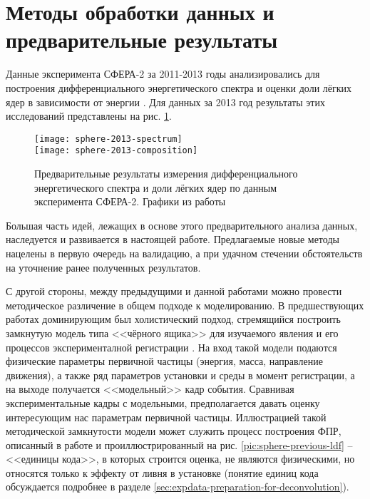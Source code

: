 \section{Методы обработки данных и предварительные результаты}

Данные эксперимента СФЕРА-2 за 2011-2013 годы анализировались для построения дифференциального энергетического спектра и оценки доли лёгких ядер в зависимости от энергии \cite{Antonov2013, Chernov2017-ICRC}. Для данных за 2013 год результаты этих исследований представлены на рис. \ref{pic:sphere-previous-results}.

\begin{figure}
	\centering
	\texttt{[image: sphere-2013-spectrum]}
	\\
	\texttt{[image: sphere-2013-composition]}
	\caption{Предварительные результаты измерения дифференциального энергетического спектра и доли лёгких ядер по данным эксперимента СФЕРА-2. Графики из работы \cite[рис. 8 и рис. 10]{Chernov2017-ICRC}}
	\label{pic:sphere-previous-results}
\end{figure}

Большая часть идей, лежащих в основе этого предварительного анализа данных, наследуется и развивается в настоящей работе. Предлагаемые новые методы нацелены в первую очередь на валидацию, а при удачном стечении обстоятельств на уточнение ранее полученных результатов.

С другой стороны, между предыдущими и данной работами можно провести методическое различение в общем подходе к моделированию. В предшествующих работах доминирующим был холистический подход, стремящийся построить замкнутую модель типа <<чёрного ящика>> для изучаемого явления и его процессов эксперименталной регистрации \cite{Chernov2015}. На вход такой модели подаются физические параметры первичной частицы (энергия, масса, направление движения), а также ряд параметров установки и среды в момент регистрации, а на выходе получается <<модельный>> кадр события. Сравнивая экспериментальные кадры с модельными, предполагается давать оценку интересующим нас параметрам первичной частицы. Иллюстрацией такой методической замкнутости модели может служить процесс построения ФПР, описанный в работе \cite{Sphere2015} и проиллюстрированный на рис. \ref{pic:sphere-previous-ldf} -- <<единицы кода>>, в которых строится оценка, не являются физическими, но относятся только к эффекту от ливня в установке (понятие единиц кода обсуждается подробнее в разделе \ref{sec:expdata-preparation-for-deconvolution}).

